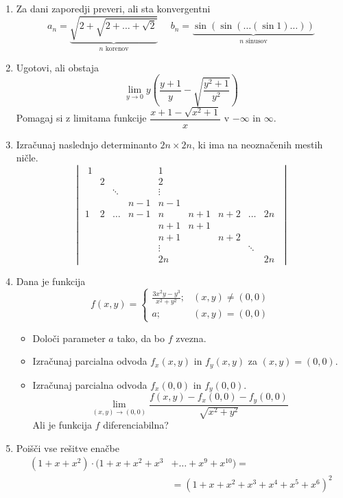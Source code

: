 \documentclass[a4paper,12pt]{article}
\begin{document}
\begin{enumerate}
\item Za dani zaporedji preveri, ali sta konvergentni
$$ a_n = \underbrace{\sqrt{2 + \sqrt{2 + \dots + \sqrt{2}}}}_{n \text{ korenov}} 
~~~~~~ b_n = \underbrace{\sin(\sin( \dots (\sin 1) \dots ))}_{n \text{ sinusov}} $$

\item Ugotovi, ali obstaja
$$ \lim_{y \to 0} y \left( \frac{y + 1}{y} - 
\sqrt{\frac{y^2 + 1}{y^2}} \right) $$
Pomagaj si z limitama funkcije $ \dfrac{x + 1 - \sqrt{x^2 + 1}}{x} $ v 
$ -\infty $ in $ \infty $.

\item Izračunaj naslednjo determinanto $ 2n \times 2n $, ki ima na neoznačenih mestih ničle.
$$ 
\begin{vmatrix}
    \; 1 & & & & 1 & & & &\\
    & 2 & & & 2 & & & &\\
    & & \ddots & & \vdots & & & &\\
    & & & n - 1 & n- 1 & & & &\\
    1 & 2 & \dots & n - 1 & n  & n + 1 & n + 2 & \dots  & 2n \\
    & & & & n + 1 & n + 1 & & &\\
    & & & & n + 1 & & n + 2 & &\\
    & & & & \vdots & & & \ddots &\\
    & & & & 2n & & & & 2n \;
\end{vmatrix} $$

\item Dana je funkcija
$$ f(x,y) = 
\begin{cases}
    \frac{3x^2 y - y^3}{x^2 + y^2}; & (x,y) \neq (0,0) \\
    a; & (x,y) = (0,0)
\end{cases}
$$
\begin{itemize}
\item Določi parameter $ a $ tako, da bo $ f $ zvezna.
\item Izračunaj parcialna odvoda $ f_x(x,y) $ in $ f_y(x,y) $ 
za $ (x,y) = (0,0) $.
\item Izračunaj parcialna odvoda $ f_x(0,0) $ in $ f_y(0,0) $.
$$  \lim_{(x,y) \to (0,0)} \frac{f(x,y) - f_x(0,0) - f_y(0,0)}
{\sqrt{x^2 + y^2}} $$
Ali je funkcija $ f $ diferenciabilna?
\end{itemize}

\item Poišči vse rešitve enačbe
\begin{align*}
(1 + x + x^2) \cdot (1 + x + x^2 + x^3 & + \ldots + x^9 + x^{10}) = \\
& = (1 + x + x^2 + x^3 + x^4 + x^5 + x^6)^2
\end{align*}


\end{enumerate}
\end{document}

